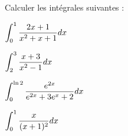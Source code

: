 \documentclass[a4paper, 11pt,reqno]{article}
\begin{document}
\begin{exercice}   \;
	Calculer les int\'egrales suivantes :
	\begin{enumerate}
		\begin{minipage}[t]{0.45\textwidth}
			\item $\displaystyle \int_0^1 \displaystyle\frac{2x+1}{x^2+x+1} dx$\vsec
			\item $\displaystyle \int_2^3 \displaystyle\frac{x+3}{x^2-1} dx$
		\end{minipage}
		\begin{minipage}[t]{0.45\textwidth}
			\item $\displaystyle\int_0^{\ln{2}} \displaystyle\frac{e^{2x}}{e^{2x}+3e^x+2  } dx$\vsec
			\item $\displaystyle\int_0^1 \displaystyle\frac{x}{(x+1)^2} dx$
		\end{minipage}
	\end{enumerate}
\end{exercice}
\end{document}
